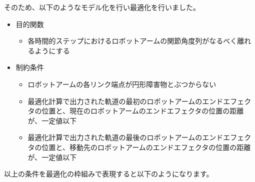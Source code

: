 そのため、以下のようなモデル化を行い最適化を行いました。

\begin{itemize}
  \item 目的関数
    \begin{itemize}
      \item 各時間的ステップにおけるロボットアームの関節角度列がなるべく離れるようにする
    \end{itemize}
  \item 制約条件
  \begin{itemize}
    \item ロボットアームの各リンク端点が円形障害物とぶつからない
    \item 最適化計算で出力された軌道の最初のロボットアームのエンドエフェクタの位置と、現在のロボットアームのエンドエフェクタの位置の距離が、一定値以下
    \item 最適化計算で出力された軌道の最後のロボットアームのエンドエフェクタの位置と、移動先のロボットアームのエンドエフェクタの位置の距離が、一定値以下
  \end{itemize}
\end{itemize}

以上の条件を最適化の枠組みで表現すると以下のようになります。


